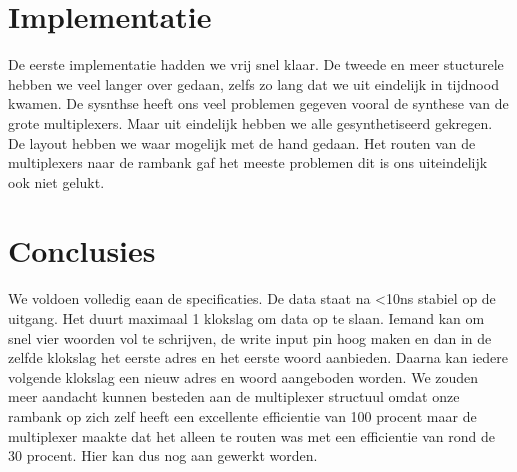 \documentclass{article}
\begin{document}

\section{Implementatie}
De eerste implementatie hadden we vrij snel klaar. De tweede en meer stucturele hebben we veel langer over gedaan, zelfs zo lang dat we uit eindelijk in tijdnood kwamen. De sysnthse heeft ons veel problemen gegeven vooral de synthese van de grote multiplexers. Maar uit eindelijk hebben we alle gesynthetiseerd gekregen. De layout hebben we waar mogelijk met de hand gedaan. Het routen van de multiplexers naar de rambank gaf het meeste problemen dit is ons uiteindelijk ook niet gelukt.

\section{Conclusies}
We voldoen volledig eaan de specificaties.
De data staat na <10ns stabiel op de uitgang.
Het duurt maximaal 1 klokslag om data op te slaan.
Iemand kan om snel vier woorden vol te schrijven, de write input pin hoog maken en dan in de zelfde klokslag het eerste adres en het eerste woord aanbieden.
Daarna kan iedere volgende klokslag een nieuw adres en woord aangeboden worden.
We zouden meer aandacht kunnen besteden aan de multiplexer structuul omdat onze rambank op zich zelf heeft een excellente efficientie van 100 procent maar de multiplexer maakte dat het alleen te routen was met een efficientie van rond de 30 procent.
Hier kan dus nog aan gewerkt worden.

\newpage
{}
\end{document}
